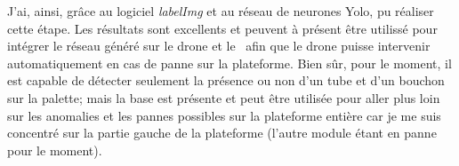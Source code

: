         J'ai, ainsi, grâce au logiciel \textit{labelImg} et au réseau de neurones Yolo, pu réaliser cette étape. Les résultats sont excellents et peuvent à présent être utilissé pour intégrer le réseau généré sur le drone et le \rpi ~afin que le drone puisse intervenir automatiquement en cas de panne sur la plateforme. Bien sûr, pour le moment, il est capable de détecter seulement la présence ou non d'un tube et d'un bouchon sur la palette; mais la base est présente et peut être utilisée pour aller plus loin sur les anomalies et les pannes possibles sur la plateforme entière car je me suis concentré sur la partie gauche de la plateforme (l'autre module étant en panne pour le moment).